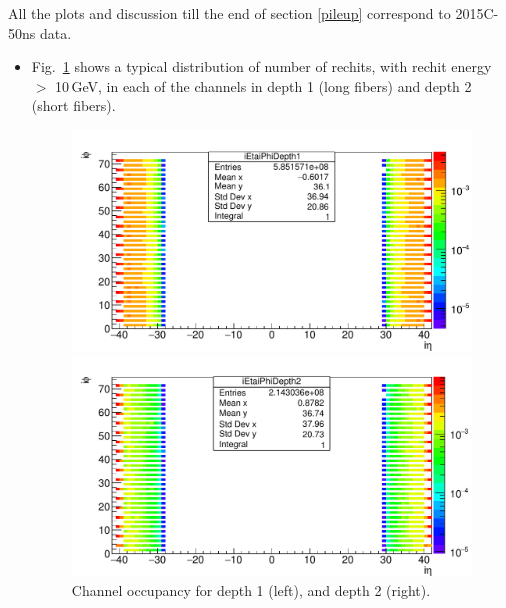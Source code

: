 All the plots and discussion till the end of section \ref{pileup} correspond to 2015C-50ns data.
\begin{itemize}
\item Fig.~\ref{fig:254833_ietavsIphiD1D2} shows a typical distribution of number of rechits, with rechit energy $>$ 10\,GeV, in each of the channels in depth 1 (long fibers) and depth 2 (short fibers). 
\begin{figure}[h!]
\begin{minipage}[b]{0.5\linewidth}
\centering
\includegraphics[width=.99\linewidth]{../Figures/Chap2/ImageFiles_HF/BasicPics/254833_ietavsIphiD1.pdf}
\end{minipage}
\begin{minipage}[b]{0.5\linewidth}
\includegraphics[width=0.99\linewidth]{../Figures/Chap2/ImageFiles_HF/BasicPics/254833_ietavsIphiD2.pdf}
\end{minipage}
\caption[Channel occupancy for depth 1 and depth 2]{Channel occupancy for depth 1 (left), and depth 2 (right).}
\label{fig:254833_ietavsIphiD1D2}
\end{figure}


\end{itemize}
